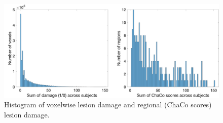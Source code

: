 \documentclass[10pt]{article}
\begin{document}
\begin{figure}[htp]
\centering
\includegraphics[width=1\linewidth]{figures/histogram_voxels_chaco.png}
\caption{Histogram of voxelwise lesion damage and regional (ChaCo scores) lesion damage.}
\label{fs_beta_coeffs}
\end{figure}
\end{document}

